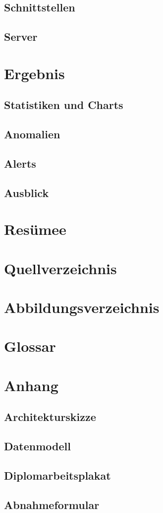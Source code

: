 \documentclass[pdftex,11pt,a4paper]{book}
\begin{document}
\section{Schnittstellen}
\section{Server}


\chapter{Ergebnis}
\section{Statistiken und Charts}
\section{Anomalien}
\section{Alerts}
\section{Ausblick}

\chapter{Resümee}


\chapter{Quellverzeichnis}

\chapter{Abbildungsverzeichnis}

\chapter{Glossar}

\chapter{Anhang}
\section{Architekturskizze}
\section{Datenmodell}
\section{Diplomarbeitsplakat}
\section{Abnahmeformular}
\end{document}
